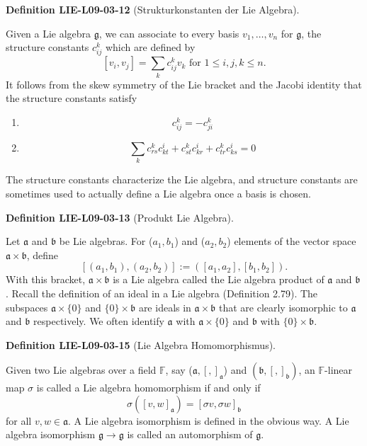 \documentclass[10pt, letterpaper]{article}
\newcommand{\CustomHeading}[3]{%
  \par\medskip\noindent%
  \textbf{#1 #2} \textnormal{(#3)}.\enskip%
}
\newenvironment{DEF}[2]{\CustomHeading{Definition}{#1}{#2}}{}
\begin{document}
\begin{DEF}{LIE-L09-03-12}{Strukturkonstanten der Lie Algebra}
Given a Lie algebra $\mathfrak{g}$, we can associate to every basis $v_{1}, \ldots, v_{n}$ for $\mathfrak{g}$, the structure constants $c_{i j}^{k}$ which are defined by
$$
\left[v_{i}, v_{j}\right]=\sum_{k} c_{i j}^{k} v_{k} \text { for } 1 \leq i, j, k \leq n .
$$
It follows from the skew symmetry of the Lie bracket and the Jacobi identity that the structure constants satisfy
\begin{enumerate}
\item $$c_{i j}^{k}=-c_{j i}^{k}$$
\item $$\sum_{k} c_{r s}^{k} c_{k t}^{i}+c_{s t}^{k} c_{k r}^{i}+c_{t r}^{k} c_{k s}^{i}=0$$
\end{enumerate}
The structure constants characterize the Lie algebra, and structure constants are sometimes used to actually define a Lie algebra once a basis is chosen.
\end{DEF}

\begin{DEF}{LIE-L09-03-13}{Produkt Lie Algebra}
Let $\mathfrak{a}$ and $\mathfrak{b}$ be Lie algebras. For ($a_{1}, b_{1}$) and ($a_{2}, b_{2}$) elements of the vector space $\mathfrak{a} \times \mathfrak{b}$, define
$$
\left[\left(a_{1}, b_{1}\right),\left(a_{2}, b_{2}\right)\right]:=\left(\left[a_{1}, a_{2}\right],\left[b_{1}, b_{2}\right]\right) .
$$
With this bracket, $\mathfrak{a} \times \mathfrak{b}$ is a Lie algebra called the Lie algebra product of $\mathfrak{a}$ and $\mathfrak{b}$. Recall the definition of an ideal in a Lie algebra (Definition 2.79). The subspaces $\mathfrak{a} \times\{0\}$ and $\{0\} \times \mathfrak{b}$ are ideals in $\mathfrak{a} \times \mathfrak{b}$ that are clearly isomorphic to $\mathfrak{a}$ and $\mathfrak{b}$ respectively. We often identify $\mathfrak{a}$ with $\mathfrak{a} \times\{0\}$ and $\mathfrak{b}$ with $\{0\} \times \mathfrak{b}$.
\end{DEF}

\begin{DEF}{LIE-L09-03-15}{Lie Algebra Homomorphismus}
Given two Lie algebras over a field $\mathbb{F}$, say ($\mathfrak{a},[,]_{\mathfrak{a}}$) and $\left(\mathfrak{b},[,]_{\mathfrak{b}}\right)$, an $\mathbb{F}$-linear map $\sigma$ is called a Lie algebra homomorphism if and only if
$$
\sigma\left([v, w]_{\mathfrak{a}}\right)=[\sigma v, \sigma w]_{\mathfrak{b}}
$$
for all $v, w \in \mathfrak{a}$. A Lie algebra isomorphism is defined in the obvious way. A Lie algebra isomorphism $\mathfrak{g} \rightarrow \mathfrak{g}$ is called an automorphism of $\mathfrak{g}$.
\end{DEF}
\end{document}

